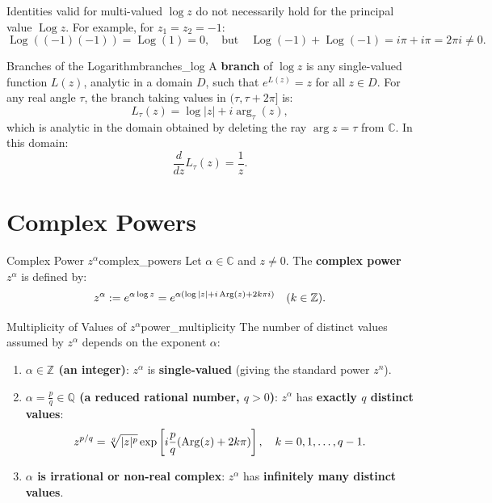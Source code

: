 \begin{remark}
Identities valid for multi-valued $\log z$ do not necessarily hold for the principal value $\operatorname{Log} z$.
For example, for $z_1 = z_2 = -1$:
\begin{equation}
\operatorname{Log}((-1)(-1)) = \operatorname{Log}(1) = 0, \quad \text{but} \quad \operatorname{Log}(-1) + \operatorname{Log}(-1) = i\pi + i\pi = 2\pi i \neq 0.
\end{equation}
\end{remark}

\begin{definition}{Branches of the Logarithm}{branches_log}
A \textbf{branch} of $\log z$ is any single-valued function $L(z)$, analytic in a domain $D$, such that $e^{L(z)} = z$ for all $z \in D$.
For any real angle $\tau$, the branch taking values in $(\tau, \tau + 2\pi]$ is:
\begin{equation}
L_\tau(z) = \log|z| + i \arg_\tau(z),
\end{equation}
which is analytic in the domain obtained by deleting the ray $\arg z = \tau$ from $\mathbb{C}$. In this domain:
\begin{equation}
\frac{d}{dz} L_\tau(z) = \frac{1}{z}.
\end{equation}
\end{definition}


\section{Complex Powers}

\begin{definition}{Complex Power $z^\alpha$}{complex_powers}
Let $\alpha \in \mathbb{C}$ and $z \neq 0$. The \textbf{complex power} $z^\alpha$ is defined by:
\begin{equation}
z^\alpha := e^{\alpha \log z} = e^{\alpha(\log|z| + i\operatorname{Arg}(z) + 2k\pi i)} \quad (k \in \mathbb{Z}).
\end{equation}
\end{definition}

\begin{proposition}{Multiplicity of Values of $z^\alpha$}{power_multiplicity}
The number of distinct values assumed by $z^\alpha$ depends on the exponent $\alpha$:
\begin{enumerate}
    \item \textbf{$\alpha \in \mathbb{Z}$ (an integer)}: $z^\alpha$ is \textbf{single-valued} (giving the standard power $z^n$).
    \item \textbf{$\alpha = \frac{p}{q} \in \mathbb{Q}$ (a reduced rational number, $q > 0$)}: $z^\alpha$ has \textbf{exactly $q$ distinct values}:
    \begin{equation}
    z^{p/q} = \sqrt[q]{|z|^p} \exp\left[i \frac{p}{q}(\operatorname{Arg}(z) + 2k\pi)\right], \quad k = 0, 1, \dots, q-1.
    \end{equation}
    \item \textbf{$\alpha$ is irrational or non-real complex}: $z^\alpha$ has \textbf{infinitely many distinct values}.
\end{enumerate}
\end{proposition}

